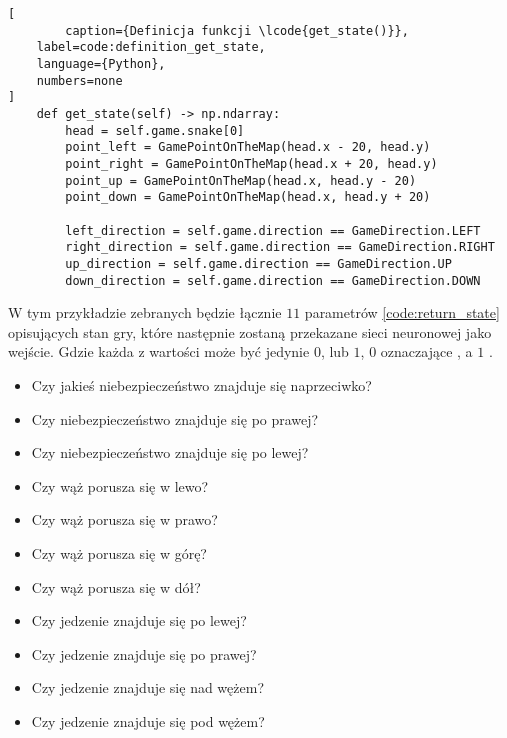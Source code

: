 \begin{onepage}
    \begin{lstlisting}[
        caption={Definicja funkcji \lcode{get_state()}},
    label=code:definition_get_state,
    language={Python},
    numbers=none
]
    def get_state(self) -> np.ndarray:
        head = self.game.snake[0]
        point_left = GamePointOnTheMap(head.x - 20, head.y)
        point_right = GamePointOnTheMap(head.x + 20, head.y)
        point_up = GamePointOnTheMap(head.x, head.y - 20)
        point_down = GamePointOnTheMap(head.x, head.y + 20)

        left_direction = self.game.direction == GameDirection.LEFT
        right_direction = self.game.direction == GameDirection.RIGHT
        up_direction = self.game.direction == GameDirection.UP
        down_direction = self.game.direction == GameDirection.DOWN
    \end{lstlisting}
\end{onepage}

W tym przykładzie zebranych będzie łącznie $11$ parametrów \ref{code:return_state} opisujących stan gry, które następnie zostaną przekazane sieci neuronowej jako wejście. Gdzie każda z wartości może być jedynie $0$, lub $1$, $0$ oznaczające , a $1$ .

\begin{itemize}
    \item Czy jakieś niebezpieczeństwo znajduje się naprzeciwko?
    \item Czy niebezpieczeństwo znajduje się po prawej?
    \item Czy niebezpieczeństwo znajduje się po lewej?
    \item Czy wąż porusza się w lewo?
    \item Czy wąż porusza się w prawo?
    \item Czy wąż porusza się w górę?
    \item Czy wąż porusza się w dół?
    \item Czy jedzenie znajduje się po lewej?
    \item Czy jedzenie znajduje się po prawej?
    \item Czy jedzenie znajduje się nad wężem?
    \item Czy jedzenie znajduje się pod wężem?
\end{itemize}


